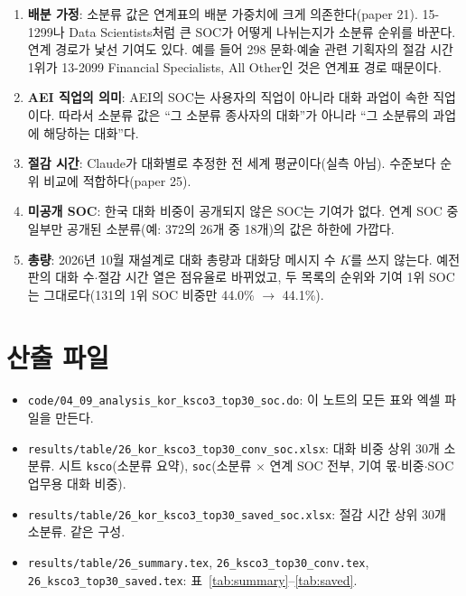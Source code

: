 \documentclass[11pt]{article}
\begin{document}
\begin{enumerate}[leftmargin=*]
  \item \textbf{배분 가정}: 소분류 값은 연계표의 배분 가중치에 크게 의존한다(paper 21). 15-1299나 Data Scientists처럼 큰 SOC가 어떻게 나뉘는지가 소분류 순위를 바꾼다. 연계 경로가 낯선 기여도 있다. 예를 들어 298 문화$\cdot$예술 관련 기획자의 절감 시간 1위가 13-2099 Financial Specialists, All Other인 것은 연계표 경로 때문이다.
  \item \textbf{AEI 직업의 의미}: AEI의 SOC는 사용자의 직업이 아니라 대화 과업이 속한 직업이다. 따라서 소분류 값은 ``그 소분류 종사자의 대화''가 아니라 ``그 소분류의 과업에 해당하는 대화''다.
  \item \textbf{절감 시간}: Claude가 대화별로 추정한 전 세계 평균이다(실측 아님). 수준보다 순위 비교에 적합하다(paper 25).
  \item \textbf{미공개 SOC}: 한국 대화 비중이 공개되지 않은 SOC는 기여가 없다. 연계 SOC 중 일부만 공개된 소분류(예: 372의 26개 중 18개)의 값은 하한에 가깝다.
  \item \textbf{총량}: 2026년 10월 재설계로 대화 총량과 대화당 메시지 수 $K$를 쓰지 않는다. 예전 판의 대화 수$\cdot$절감 시간 열은 점유율로 바뀌었고, 두 목록의 순위와 기여 1위 SOC는 그대로다(131의 1위 SOC 비중만 44.0\% $\to$ 44.1\%).
\end{enumerate}

\section{산출 파일}

\begin{itemize}[leftmargin=*]
  \item \texttt{code/04\_09\_analysis\_kor\_ksco3\_top30\_soc.do}: 이 노트의 모든 표와 엑셀 파일을 만든다.
  \item \texttt{results/table/26\_kor\_ksco3\_top30\_conv\_soc.xlsx}: 대화 비중 상위 30개 소분류. 시트 \texttt{ksco}(소분류 요약), \texttt{soc}(소분류 $\times$ 연계 SOC 전부, 기여 몫$\cdot$비중$\cdot$SOC 업무용 대화 비중).
  \item \texttt{results/table/26\_kor\_ksco3\_top30\_saved\_soc.xlsx}: 절감 시간 상위 30개 소분류. 같은 구성.
  \item \texttt{results/table/26\_summary.tex}, \texttt{26\_ksco3\_top30\_conv.tex}, \texttt{26\_ksco3\_top30\_saved.tex}: 표~\ref{tab:summary}--\ref{tab:saved}.
\end{itemize}
\end{document}

